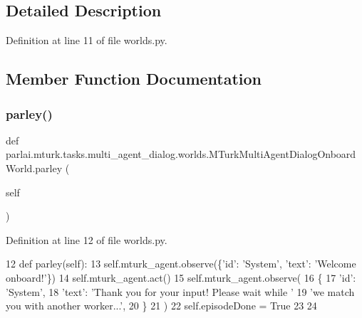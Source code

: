 \subsection{Detailed Description}


Definition at line 11 of file worlds.\+py.



\subsection{Member Function Documentation}
\mbox{\label{classparlai_1_1mturk_1_1tasks_1_1multi__agent__dialog_1_1worlds_1_1MTurkMultiAgentDialogOnboardWorld_a7d4faad98ebcfd2479530e0f10e1d7ca}} 
\subsubsection{\texorpdfstring{parley()}{parley()}}
{\footnotesize\ttfamily def parlai.\+mturk.\+tasks.\+multi\+\_\+agent\+\_\+dialog.\+worlds.\+M\+Turk\+Multi\+Agent\+Dialog\+Onboard\+World.\+parley (\begin{DoxyParamCaption}\item[{}]{self }\end{DoxyParamCaption})}



Definition at line 12 of file worlds.\+py.


\begin{DoxyCode}
12     \textcolor{keyword}{def }parley(self):
13         self.mturk\_agent.observe(\{\textcolor{stringliteral}{'id'}: \textcolor{stringliteral}{'System'}, \textcolor{stringliteral}{'text'}: \textcolor{stringliteral}{'Welcome onboard!'}\})
14         self.mturk\_agent.act()
15         self.mturk\_agent.observe(
16             \{
17                 \textcolor{stringliteral}{'id'}: \textcolor{stringliteral}{'System'},
18                 \textcolor{stringliteral}{'text'}: \textcolor{stringliteral}{'Thank you for your input! Please wait while '}
19                 \textcolor{stringliteral}{'we match you with another worker...'},
20             \}
21         )
22         self.episodeDone = \textcolor{keyword}{True}
23 
24 
\end{DoxyCode}


